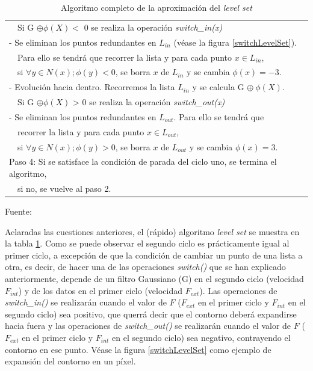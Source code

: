 \begin{table}[H]
\begin{tabular}{|l|}
		\quad \quad \quad \quad \ \ Si  G $\oplus \phi(X) <$ 0 se realiza la operaci\'{o}n \textit{switch\_in(x)} \\ 
		\quad \quad \quad \quad - Se eliminan los puntos redundantes en $L_{in}$ (v\'{e}ase la figura \ref{switchLevelSet}).\\ 
		\quad \quad \quad \quad \ \ Para ello se tendr\'{a} que recorrer la lista y para cada punto $x \in L_{in}$,\\
		\quad \quad \quad \quad \ \ si $\forall y \in N(x); \phi(y) < 0$, se borra $x$ de $L_{in}$ y se cambia $\phi(x) = -3$. \\ 
		\quad \quad \quad \quad - Evoluci\'{o}n hacia dentro. Recorremos la lista $L_{in}$ y se calcula  G $\oplus \ \phi(X)$. \\ 
		\quad \quad \quad \quad \ \ Si G $\oplus \phi(X)$ > 0 se realiza la operaci\'{o}n \textit{switch\_out(x)}  \\ 
		\quad \quad \quad \quad - Se eliminan los puntos redundantes en $L_{out}$. Para ello se tendr\'{a} que \\
		\quad \quad \quad \quad \ \ recorrer la lista y para cada punto $x \in L_{out}$,\\
		\quad \quad \quad \quad \ \ si $\forall y \in N(x); \phi(y) > 0$, se borra $x$ de $L_{out}$ y se cambia $\phi(x) = 3$. \\
		\tabitem Paso 4:  Si se satisface la condici\'{o}n de parada del ciclo uno, se termina el algoritmo, \\
		\quad \quad \quad \quad \ \ si no, se vuelve al paso 2. \\
		\hline
	\end{tabular}
	\caption{Algoritmo completo de la aproximaci\'{o}n del \textit{level set}}
	\vspace{2 mm}		
	Fuente: \cite{yong1}
	\label{algoritmoFastLevelSet}
\end{table}


Aclaradas las cuestiones anteriores, el (r\'{a}pido) algoritmo \textit{level set} \cite{yong1} se muestra en la tabla \ref{algoritmoFastLevelSet}. Como se puede observar el segundo ciclo es pr\'{a}cticamente igual al primer ciclo, a excepci\'{o}n de que la condici\'{o}n de cambiar un punto de una lista a otra, es decir, de hacer una de las operaciones \textit{switch()} que se han explicado anteriormente, depende de un filtro Gaussiano (G) en el segundo ciclo (velocidad $F_{int}$) y de los datos en el primer ciclo (velocidad $F_{ext}$). Las operaciones de \textit{switch\_in()} se realizar\'{a}n cuando el valor de $F$ ($F_{ext}$ en el primer ciclo y $F_{int}$ en el segundo ciclo) sea positivo, que querr\'{a} decir que el contorno deber\'{a} expandirse hacia fuera y las operaciones de \textit{switch\_out()} se realizar\'{a}n cuando el valor de $F$ ($F_{ext}$ en el primer ciclo y $F_{int}$ en el segundo ciclo) sea negativo, contrayendo el contorno en ese punto. V\'{e}ase la figura \ref{switchLevelSet} como ejemplo de expansi\'{o}n del contorno en un p\'{i}xel.

